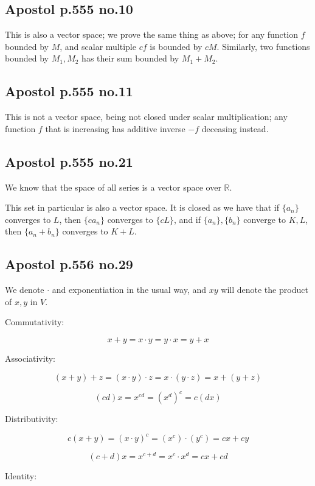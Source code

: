 \documentclass[12pt,letterpaper]{article}
\theoremstyle{definition}
\newcommand{\R}{\mathbb{R}}
\begin{document}
\subsection*{Apostol p.555 no.10}

This is also a vector space; we prove the same thing as above; for any function $f$ bounded
by $M$, and scalar multiple $cf$ is bounded by $cM$. Similarly, two functions
bounded by $M_1, M_2$ has their sum bounded by $M_1 + M_2$.

\subsection*{Apostol p.555 no.11}

This is not a vector space, being not closed under scalar multiplication; any
function $f$ that is increasing has additive inverse $-f$ deceasing instead.

\subsection*{Apostol p.555 no.21}

We know that the space of all series is a vector space over $\R$.

This set in particular is also a vector space. It is closed as we have that if $\{a_n\}$ converges to
$L$, then $\{ca_n\}$ converges to $\{cL\}$, and if $\{a_n\}, \{b_n\}$ converge
to $K, L$, then $\{a_n + b_n\}$ converges to $K + L$.

\subsection*{Apostol p.556 no.29}

We denote $\cdot$ and exponentiation in the usual way, and $xy$ will denote the
product of $x, y$ in $V$.

Commutativity:

\[
  x + y = x \cdot y = y \cdot x = y + x
\]

Associativity:

\[
  (x + y) + z = (x \cdot y) \cdot z = x \cdot (y \cdot z) = x + (y + z)
\]

\[
  (cd)x = x^{cd} = (x^d)^c = c(dx)
\]

Distributivity:

\[
  c(x + y) = (x \cdot y)^c = (x^c)\cdot(y^c) = cx + cy
\]

\[
  (c + d)x = x^{c + d} = x^c\cdot x^d = cx + cd
\]

Identity:
\end{document}
